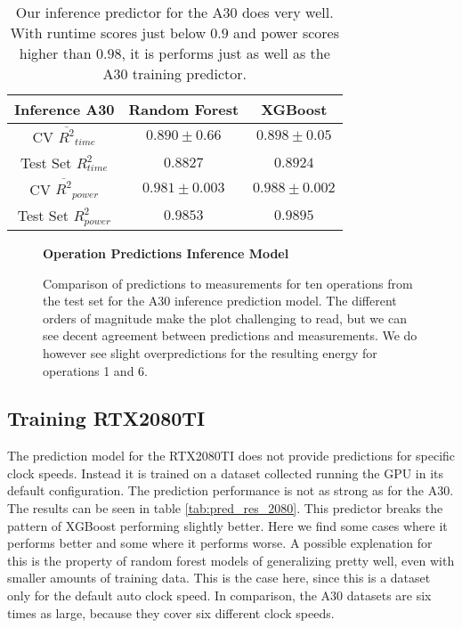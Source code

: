 \begin{table}[h!]
\centering
\begin{tabular}{|c|c|c|}
\hline
 \textbf{Inference A30}& \textbf{Random Forest} & \textbf{XGBoost} \\
\hline
CV $\overline{R^2}_{time}$ & $0.890 \pm 0.66$ &  $0.898 \pm 0.05$ \\
\hline
Test Set $R^2_{time}$ & $0.8827$ & $0.8924$ \\
\hline
CV $\overline{R^2}_{power}$ & $0.981 \pm 0.003$  &  $0.988 \pm 0.002$\\
\hline
Test Set $R^2_{power}$ & $0.9853$ & $0.9895$ \\
\hline
\end{tabular}
\caption{Our inference predictor for the A30 does very well. With runtime scores just below $0.9$ and power scores higher than $0.98$, it is performs just as well as the A30 training predictor. }
\label{tab:pred_res_inf}
\end{table}



\begin{figure}[htbp]
    \centering
    \parbox{1.1\textwidth}{\centering\textbf{Operation Predictions Inference Model}}
    \caption{Comparison of predictions to measurements for ten operations from the test set for the A30 inference prediction model. The different orders of magnitude make the plot challenging to read, but we can see decent agreement between predictions and measurements. We do however see slight overpredictions for the resulting energy for operations 1 and 6.}
    \label{fig:testsetops_inf}
\end{figure}


\subsection{Training RTX2080TI}

The prediction model for the RTX2080TI does not provide predictions for specific clock speeds. Instead it is trained on a dataset collected running the GPU in its default configuration. The prediction performance is not as strong as for the A30. The results can be seen in table \ref{tab:pred_res_2080}. This predictor breaks the pattern of XGBoost performing slightly better. Here we find some cases where it performs better and some where it performs worse. A possible explenation for this is the property of random forest models of generalizing pretty well, even with smaller amounts of training data. This is the case here, since this is a dataset only for the default auto clock speed. 
In comparison, the A30 datasets are six times as large, because they cover six different clock speeds.

